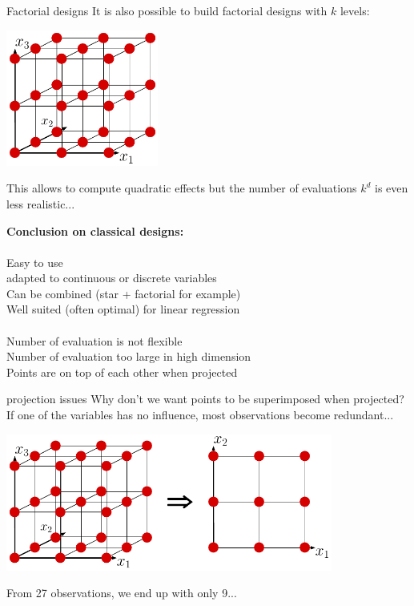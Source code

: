 \documentclass{beamer}
\begin{document}
\begin{frame}{Factorial designs}
It is also possible to build factorial designs with $k$ levels:
\begin{center}
\includegraphics[width=5cm]{figures/latexdraw/factorial3levels}
\end{center}
This allows to compute quadratic effects but the number of evaluations $k^d$ is even less realistic...
\end{frame}

\begin{frame}{}
\textbf{Conclusion on classical designs:}\\
\\
\quad Easy to use\\
\quad adapted to continuous or discrete variables\\
\quad Can be combined (star + factorial for example)\\
\quad Well suited (often optimal) for linear regression\\
\vspace{5mm}
\\
\quad Number of evaluation is not flexible\\
\quad Number of evaluation too large in high dimension\\
\quad Points are on top of each other when projected
\end{frame}

\begin{frame}{projection issues}
Why don't we want points to be superimposed when projected?\\
If one of the variables has no influence, most observations become redundant...
\begin{center}
\includegraphics[height=4.5cm]{figures/latexdraw/factorialprojection}
\end{center}
From 27 observations, we end up with only 9...
\end{frame}
\end{document}
